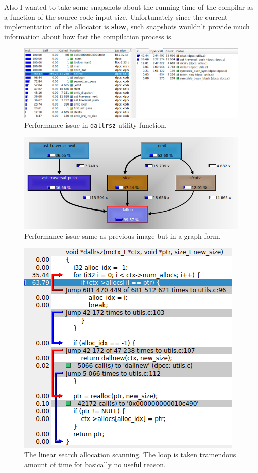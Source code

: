 \documentclass[a4paper]{article}
\begin{document}
Also I wanted to take some snapshots about the running time of the compilar as a function of the  source code input
size. Unfortunately since the current implementation of the allocator is \textbf{slow}, such snapshots
wouldn't provide much information about how fast the compilation process is.

\begin{figure}[H]
    \centering
    \includegraphics[width=\linewidth]{imgs/dallrsz_performance_issue.png}
    \caption{Performance issue in \texttt{dallrsz} utility function.}
\end{figure}


\begin{figure}[H]
    \centering
    \includegraphics[scale=0.85]{imgs/dallrsz_callgraph.png}
    \caption{Performance issue same as previous image but in a graph form.}
\end{figure}


\begin{figure}[H]
    \centering
    \includegraphics{imgs/dallrsz_code_usage.png}
    \caption{The linear search allocation scanning. The loop is taken tramendous amount of time for basically no useful reason.}
\end{figure}
\end{document}
